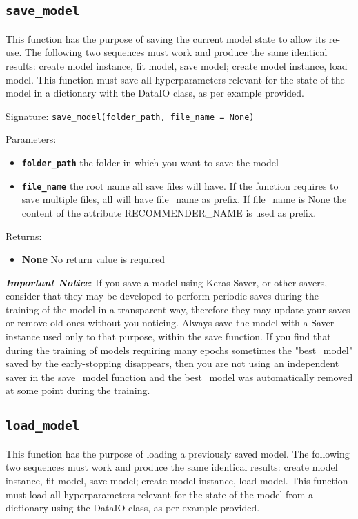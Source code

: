 \subsection{\texttt{save\_model}}
This function has the purpose of saving the current model state to allow its re-use.
The following two sequences must work and produce the same identical results: create model instance, fit model, save model; create model instance, load model.
This function must save all hyperparameters relevant for the state of the model in a dictionary with the DataIO class, as per example provided.

Signature: \texttt{save\_model(folder\_path, file\_name = None)}

Parameters:
\begin{itemize}
    \item \textbf{\texttt{folder\_path}} the folder in which you want to save the model
    \item \textbf{\texttt{file\_name}} the root name all save files will have. If the function requires to save multiple files, all will have file\_name as prefix. If file\_name is None the content of the attribute RECOMMENDER\_NAME is used as prefix.

\end{itemize}

Returns:
\begin{itemize}
    \item \textbf{None} No return value is required
\end{itemize}



\textbf{\emph{Important Notice}}: If you save a model using Keras Saver, or other savers, consider that they may be developed to perform periodic saves during the training of the model in a transparent way, therefore they may update your saves or remove old ones without you noticing. Always save the model with a Saver instance used only to that purpose, within the save function. If you find that during the training of models requiring many epochs sometimes the "best\_model" saved by the early-stopping disappears, then you are not using an independent saver in the save\_model function and the best\_model was automatically removed at some point during the training.


\subsection{\texttt{load\_model}}
This function has the purpose of loading a previously saved model.
The following two sequences must work and produce the same identical results: create model instance, fit model, save model; create model instance, load model.
This function must load all hyperparameters relevant for the state of the model from a dictionary using the DataIO class, as per example provided.

